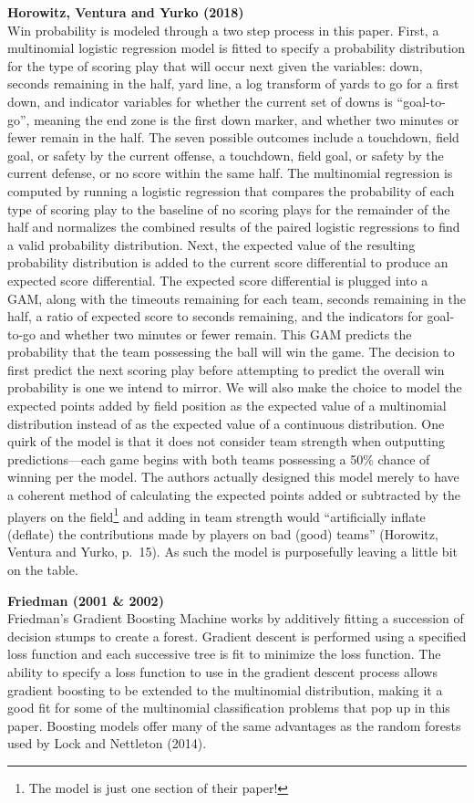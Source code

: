 \documentclass[12pt,twoside]{dukestatscithesis}
\begin{document}
\textbf{Horowitz, Ventura and Yurko (2018)}\\
Win probability is modeled through a two step process in this paper. First, a multinomial logistic regression model is fitted to specify a probability distribution for the type of scoring play that will occur next given the variables: down, seconds remaining in the half, yard line, a log transform of yards to go for a first down, and indicator variables for whether the current set of downs is ``goal-to-go'', meaning the end zone is the first down marker, and whether two minutes or fewer remain in the half. The seven possible outcomes include a touchdown, field goal, or safety by the current offense, a touchdown, field goal, or safety by the current defense, or no score within the same half. The multinomial regression is computed by running a logistic regression that compares the probability of each type of scoring play to the baseline of no scoring plays for the remainder of the half and normalizes the combined results of the paired logistic regressions to find a valid probability distribution. Next, the expected value of the resulting probability distribution is added to the current score differential to produce an expected score differential. The expected score differential is plugged into a GAM, along with the timeouts remaining for each team, seconds remaining in the half, a ratio of expected score to seconds remaining, and the indicators for goal-to-go and whether two minutes or fewer remain. This GAM predicts the probability that the team possessing the ball will win the game. The decision to first predict the next scoring play before attempting to predict the overall win probability is one we intend to mirror. We will also make the choice to model the expected points added by field position as the expected value of a multinomial distribution instead of as the expected value of a continuous distribution. One quirk of the model is that it does not consider team strength when outputting predictions---each game begins with both teams possessing a 50\% chance of winning per the model. The authors actually designed this model merely to have a coherent method of calculating the expected points added or subtracted by the players on the field\footnote{The model is just one section of their paper!} and adding in team strength would ``artificially inflate (deflate) the contributions made by players on bad (good) teams'' (Horowitz, Ventura and Yurko, p.~15). As such the model is purposefully leaving a little bit on the table.

\textbf{Friedman (2001 \& 2002)}\\
Friedman's Gradient Boosting Machine works by additively fitting a succession of decision stumps to create a forest. Gradient descent is performed using a specified loss function and each successive tree is fit to minimize the loss function. The ability to specify a loss function to use in the gradient descent process allows gradient boosting to be extended to the multinomial distribution, making it a good fit for some of the multinomial classification problems that pop up in this paper. Boosting models offer many of the same advantages as the random forests used by Lock and Nettleton (2014).
\end{document}
